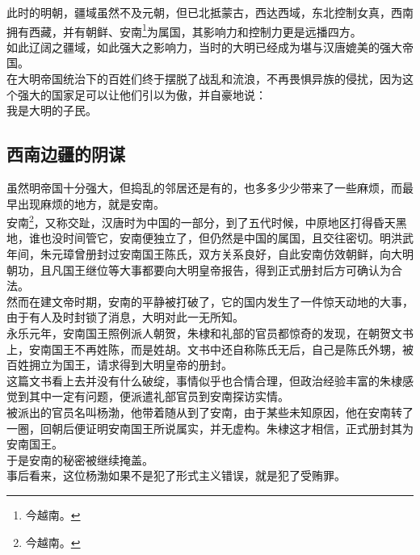 \begin{multicols}{\theparacolNo}
此时的明朝，疆域虽然不及元朝，但已北抵蒙古，西达西域，东北控制女真，西南拥有西藏，并有朝鲜、安南\footnote{今越南。}为属国，其影响力和控制力更是远播四方。\\

如此辽阔之疆域，如此强大之影响力，当时的大明已经成为堪与汉唐媲美的强大帝国。\\

在大明帝国统治下的百姓们终于摆脱了战乱和流浪，不再畏惧异族的侵扰，因为这个强大的国家足可以让他们引以为傲，并自豪地说：\\

我是大明的子民。\\

\subsection{西南边疆的阴谋}
虽然明帝国十分强大，但捣乱的邻居还是有的，也多多少少带来了一些麻烦，而最早出现麻烦的地方，就是安南。\\

安南\footnote{今越南。}，又称交趾，汉唐时为中国的一部分，到了五代时候，中原地区打得昏天黑地，谁也没时间管它，安南便独立了，但仍然是中国的属国，且交往密切。明洪武年间，朱元璋曾册封过安南国王陈氏，双方关系良好，自此安南仿效朝鲜，向大明朝功，且凡国王继位等大事都要向大明皇帝报告，得到正式册封后方可确认为合法。\\

然而在建文帝时期，安南的平静被打破了，它的国内发生了一件惊天动地的大事，由于有人及时封锁了消息，大明对此一无所知。\\

永乐元年，安南国王照例派人朝贺，朱棣和礼部的官员都惊奇的发现，在朝贺文书上，安南国王不再姓陈，而是姓胡。文书中还自称陈氏无后，自己是陈氏外甥，被百姓拥立为国王，请求得到大明皇帝的册封。\\

这篇文书看上去并没有什么破绽，事情似乎也合情合理，但政治经验丰富的朱棣感觉到其中一定有问题，便派遣礼部官员到安南探访实情。\\

被派出的官员名叫杨渤，他带着随从到了安南，由于某些未知原因，他在安南转了一圈，回朝后便证明安南国王所说属实，并无虚构。朱棣这才相信，正式册封其为安南国王。\\

于是安南的秘密被继续掩盖。\\

事后看来，这位杨渤如果不是犯了形式主义错误，就是犯了受贿罪。\\


\end{multicols}
